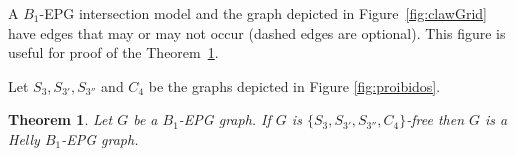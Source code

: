 \documentclass[9pt]{entcs}
\newtheorem{teo}{Theorem}[section]
\begin{document}
A $B_1$-EPG intersection model and the graph depicted in Figure~\ref{fig:clawGrid} have edges that may or may not occur (dashed edges are optional). This figure is useful for proof of the Theorem~\ref{lem:chordalDiamondFree}.


Let $S_{3}, S_{3'}, S_{3''}$ and $ C_{4}$ be the graphs depicted in Figure \ref{fig:proibidos}. 



\begin{teo}
\label{lem:chordalDiamondFree}
Let $G$ be a $B_1$-EPG graph. If $G$ is  $\{S_{3}, S_{3'}, S_{3''}, C_{4}\}$-free then $G$  is a Helly $B_1$-EPG graph.
\end{teo}
\end{document}
